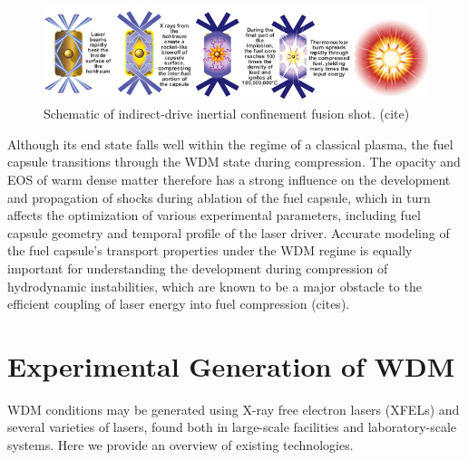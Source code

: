 \documentclass [11pt, proquest, article] {uwthesis}[2016/11/22]
\begin{document}
\begin{figure}[h] \label{icf}
\caption{Schematic of indirect-drive inertial confinement fusion shot. (cite)}
\centering
\includegraphics[scale=0.5]{../Figures/indirect-drive.jpg}
\end{figure}

Although its end state falls well within the regime of a classical plasma, the fuel capsule transitions through the WDM state during compression. The opacity and EOS of warm dense matter therefore has a strong influence on the development and propagation of shocks during ablation of the fuel capsule, which in turn affects the optimization of various experimental parameters, including fuel capsule geometry and temporal profile of the laser driver. Accurate modeling of the fuel capsule's transport properties under the WDM regime is equally important for understanding the development during compression of hydrodynamic instabilities, which are known to be a major obstacle to the efficient coupling of laser energy into fuel compression (cites).

\section{Experimental Generation of WDM}
WDM conditions may be generated using X-ray free electron lasers (XFELs) and several varieties of lasers, found both in large-scale facilities and laboratory-scale systems. Here we provide an overview of existing technologies. 
\end{document}
